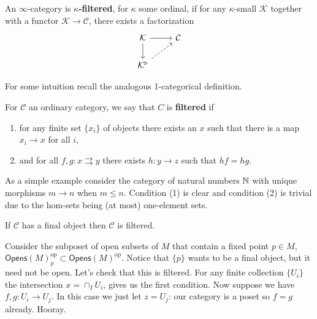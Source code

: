 \documentclass{amsart}
\begin{document}
\begin{definition}
    An $\infty$-category is \textbf{$\kappa$-filtered}, for $\kappa$ some ordinal, if
    for any $\kappa$-small $\mathcal{K}$ together with a functor $\mathcal{K}\to\mathcal{C}$,
    there exists a factorization
    \begin{equation*}
        \begin{tikzcd}
            \mathcal{K} \rar\dar & \mathcal{C} \\
            \mathcal{K}^\triangleright \ar[ur, dashed]
        \end{tikzcd}
    \end{equation*}
\end{definition}
For some intuition recall the analogous 1-categorical definition.
\begin{definition}
    For $\mathcal{C}$ an ordinary category, we say that $C$ is \textbf{filtered} if
    \begin{enumerate}
        \item for any finite set $\{x_i\}$ of objects there exists an $x$ such that there is a map $x_i\to x$ for all $i$,
        \item and for all $f,g: x\rightrightarrows y$ there exists $h:y\to z$ such that $hf=hg$.
    \end{enumerate}
\end{definition}
\begin{example}
    As a simple example consider the category of natural numbers $\mathbb{N}$ with
    unique morphisms $m\to n$ when $m\leq n$. Condition (1) is clear and condition
    (2) is trivial due to the hom-sets being (at most) one-element sets.
\end{example}
\begin{example}
    If $\mathcal{C}$ has a final object then $\mathcal{C}$ is filtered.
\end{example}
\begin{example}
    Consider the subposet of open subsets of $M$ that contain a fixed point $p\in M$,
    $\mathsf{Opens}(M)_p^\text{op}\subset \mathsf{Opens}(M)^\text{op}$. Notice
    that $\{p\}$ wants to be a final object, but it need not be open. Let's check
    that this is filtered. For any finite collection $\{U_i\}$ the intersection
    $x=\cap_I U_i$, gives us the first condition.
    Now suppose we have $f, g:U_i\to U_j$. In this case we just let $z=U_j$: our
    category is a poset so $f=g$ already. Hooray.
\end{example}
\end{document}
